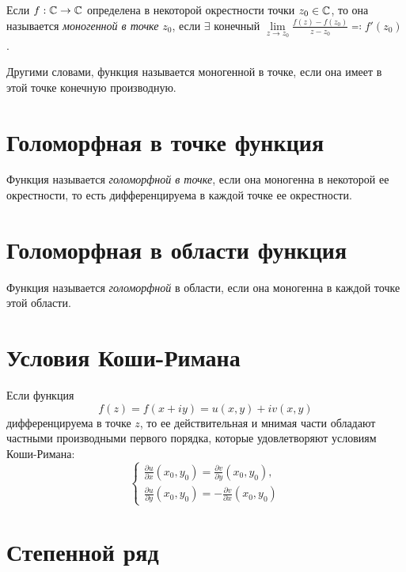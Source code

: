 \begin{definition}
	Если $f: \mathbb{C} \rightarrow \mathbb{C}$ определена в некоторой окрестности точки $z_0 \in \mathbb{C}$, то она называется \emph{моногенной в точке} $z_0$, если $\exists $ конечный $\underset{z \rightarrow z_0}{\lim}\frac{f(z) - f(z_0)}{z-z_0}\eqqcolon f'(z_0)$.

	Другими словами, функция называется моногенной в точке, если она имеет в этой точке конечную производную.
\end{definition}

\section{Голоморфная в точке функция}

\begin{definition}
	Функция называется \emph{голоморфной в точке}, если она моногенна в некоторой ее окрестности, то есть дифференцируема в каждой точке ее окрестности.
\end{definition}

\section{Голоморфная в области функция}

\begin{definition}
	Функция называется \emph{голоморфной} в области, если она моногенна в каждой точке этой области.
\end{definition}

\section{Условия Коши-Римана}

\begin{note}
	Если функция
	\[
		f(z) = f(x+iy) = u(x,y) + iv(x,y)
	\]
	дифференцируема в точке $z$, то ее действительная и мнимая части обладают частными производными первого порядка, которые удовлетворяют условиям Коши-Римана:
	\[
		\left\{\begin{array}{l}
			\frac{\partial u}{\partial x}(x_0,y_0) = \frac{\partial v}{\partial y}(x_0,y_0), \\
			\frac{\partial u}{\partial y}(x_0,y_0) = - \frac{\partial v}{\partial x}(x_0,y_0)
		\end{array}\right.
	\]
\end{note}

\section{Степенной ряд}

